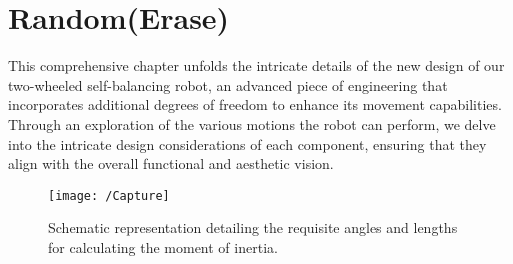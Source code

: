 \chapter{Random(Erase)}

\graphicspath{{./Figures/Design}}

This comprehensive chapter unfolds the intricate details of the new design of our two-wheeled self-balancing robot, an advanced piece of engineering that incorporates additional degrees of freedom to enhance its movement capabilities. Through an exploration of the various motions the robot can perform, we delve into the intricate design considerations of each component, ensuring that they align with the overall functional and aesthetic vision. 


\begin{figure}[h]
	\centering
	\texttt{[image: /Capture]}
	\caption[Moment of inertia Schematic representation]{Schematic representation detailing the requisite angles and lengths for calculating the moment of inertia.}
	\label{fig:Schematic representation detailing the requisite angles and lengths for calculating the moment of inertia.}
\end{figure}
\newpage
